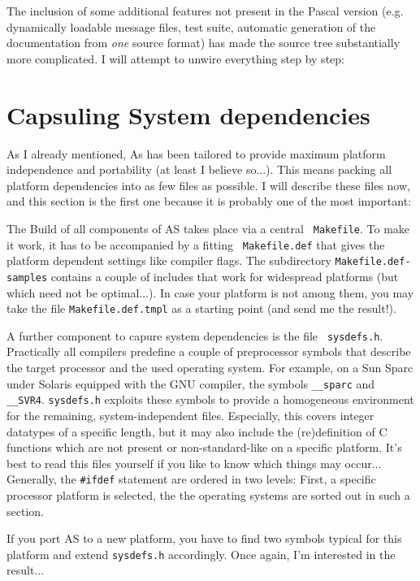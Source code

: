 \documentclass[12pt,twoside]{report}
\begin{document}
The inclusion of some additional features not present in the Pascal
version (e.g. dynamically loadable message files, test suite, automatic
generation of the documentation from {\em one} source format) has made the
source tree substantially more complicated.  I will attempt to unwire
everything step by step:


\section{Capsuling System dependencies}

As I already mentioned, As has been tailored to provide maximum platform
independence and portability (at least I believe so...).  This means
packing all platform dependencies into as few files as possible.  I will
describe these files now, and this section is the first one because it is
probably one of the most important:

The Build of all components of AS takes place via a central {\tt
Makefile}.  To make it work, it has to be accompanied by a fitting {\tt
Makefile.def} that gives the platform dependent settings like compiler
flags.  The subdirectory {\tt Makefile.def-samples} contains a couple of
includes that work for widespread platforms (but which need not be
optimal...).  In case your platform is not among them, you may take the
file {\tt Makefile.def.tmpl} as a starting point (and send me the
result!).

A further component to capure system dependencies is the file {\tt
sysdefs.h}.  Practically all compilers predefine a couple of preprocessor
symbols that describe the target processor and the used operating system. 
For example, on a Sun Sparc under Solaris equipped with the GNU compiler,
the symbols \verb!__sparc! and \verb!__SVR4!.  {\tt sysdefs.h} exploits
these symbols to provide a homogeneous environment for the remaining,
system-independent files.  Especially, this covers integer datatypes of a
specific length, but it may also include the (re)definition of C functions
which are not present or non-standard-like on a specific platform.  It's
best to read this files yourself if you like to know which things may
occur...  Generally, the \verb!#ifdef! statement are ordered in two
levels: First, a specific processor platform is selected, the the
operating systems are sorted out in such a section.

If you port AS to a new platform, you have to find two symbols typical for
this platform and extend {\tt sysdefs.h} accordingly.  Once again, I'm
interested in the result...
\end{document}
